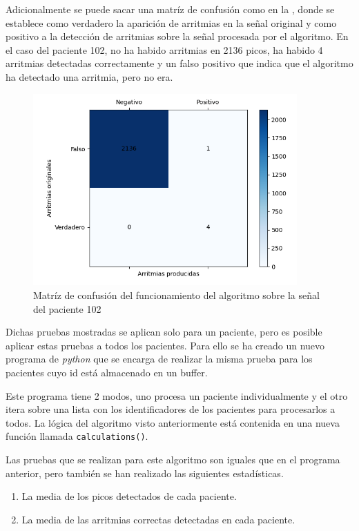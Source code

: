 Adicionalmente se puede sacar una matríz de confusión como en la , donde se establece como verdadero la aparición de arritmias en la señal original y como positivo a la detección de arritmias sobre la señal procesada por el algoritmo. En el caso del paciente 102, no ha habido arritmias en 2136 picos, ha habido 4 arritmias detectadas correctamente y un falso positivo que indica que el algoritmo ha detectado una arritmia, pero no era.

\begin{figure}[h!]
	\centering
    \includegraphics[width=0.9\textwidth]{./Images/img_algoritmo/matrizdeconfusion.png}
    \caption[Matríz de confusión]{Matríz de confusión del funcionamiento del algoritmo sobre la señal del paciente 102}
    \label{fig:matrizdeconfusion}
\end{figure} 

Dichas pruebas mostradas se aplican solo para un paciente, pero es posible aplicar estas pruebas a todos los pacientes.
Para ello se ha creado un nuevo programa de \textit{python} que se encarga de realizar la misma prueba para los pacientes cuyo id está
almacenado en un buffer.

Este programa tiene 2 modos, uno procesa un paciente individualmente y el otro itera sobre una lista con los identificadores de los pacientes para procesarlos a todos. La lógica del algoritmo visto anteriormente está contenida en una nueva función llamada \lstinline{calculations()}.

Las pruebas que se realizan para este algoritmo son iguales que en el programa anterior, pero también
se han realizado las siguientes estadísticas.

\begin{enumerate}
	\item La media de los picos detectados de cada paciente.
	\item La media de las arritmias correctas detectadas en cada paciente.
\end{enumerate} 